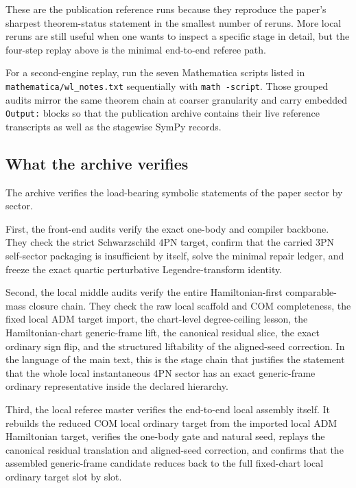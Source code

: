 \documentclass[11pt]{article}
\begin{document}
These are the publication reference runs because they reproduce the paper's
sharpest theorem-status statement in the smallest number of reruns.  More local
reruns are still useful when one wants to inspect a specific stage in detail,
but the four-step replay above is the minimal end-to-end referee path.

For a second-engine replay, run the seven Mathematica scripts listed in
\nolinkurl{mathematica/wl_notes.txt} sequentially with \nolinkurl{math -script}.
Those grouped audits mirror the same theorem chain at coarser granularity and
carry embedded \texttt{Output:} blocks so that the publication archive contains
their live reference transcripts as well as the stagewise SymPy records.

\subsection{What the archive verifies}
\label{app:verification-what-verifies}

The archive verifies the load-bearing symbolic statements of the paper sector by
sector.

First, the front-end audits verify the exact one-body and compiler backbone.
They check the strict Schwarzschild $4$PN target, confirm that the carried $3$PN
self-sector packaging is insufficient by itself, solve the minimal repair
ledger, and freeze the exact quartic perturbative Legendre-transform identity.

Second, the local middle audits verify the entire Hamiltonian-first comparable-
mass closure chain.  They check the raw local scaffold and COM completeness, the
fixed local ADM target import, the chart-level degree-ceiling lesson, the
Hamiltonian-chart generic-frame lift, the canonical residual slice, the exact
ordinary sign flip, and the structured liftability of the aligned-seed
correction.  In the language of the main text, this is the stage chain that
justifies the statement that the whole local instantaneous $4$PN sector has an
exact generic-frame ordinary representative inside the declared hierarchy.

Third, the local referee master verifies the end-to-end local assembly itself.
It rebuilds the reduced COM local ordinary target from the imported local ADM
Hamiltonian target, verifies the one-body gate and natural seed, replays the
canonical residual translation and aligned-seed correction, and confirms that
the assembled generic-frame candidate reduces back to the full fixed-chart local
ordinary target slot by slot.
\end{document}
